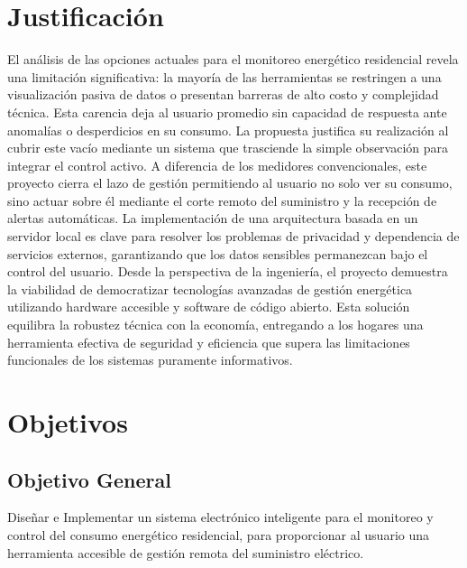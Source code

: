 \section{Justificación}

    El análisis de las opciones actuales para el monitoreo energético residencial revela una limitación significativa: la mayoría de las herramientas se restringen a una visualización pasiva de datos o presentan barreras de alto costo y complejidad técnica.
    Esta carencia deja al usuario promedio sin capacidad de respuesta ante anomalías o desperdicios en su consumo.
    La propuesta justifica su realización al cubrir este vacío mediante un sistema que trasciende la simple observación para integrar el control activo.
    A diferencia de los medidores convencionales, este proyecto cierra el lazo de gestión permitiendo al usuario no solo ver su consumo, sino actuar sobre él mediante el corte remoto del suministro y la recepción de alertas automáticas.
    La implementación de una arquitectura basada en un servidor local es clave para resolver los problemas de privacidad y dependencia de servicios externos, garantizando que los datos sensibles permanezcan bajo el control del usuario.
    Desde la perspectiva de la ingeniería, el proyecto demuestra la viabilidad de democratizar tecnologías avanzadas de gestión energética utilizando hardware accesible y software de código abierto.
    Esta solución equilibra la robustez técnica con la economía, entregando a los hogares una herramienta efectiva de seguridad y eficiencia que supera las limitaciones funcionales de los sistemas puramente informativos.
\newpage

\section{Objetivos}

    \subsection{Objetivo General}
        Diseñar e Implementar un sistema electrónico inteligente para el monitoreo y control del consumo energético residencial, para proporcionar al usuario una herramienta accesible de gestión remota del suministro eléctrico.
